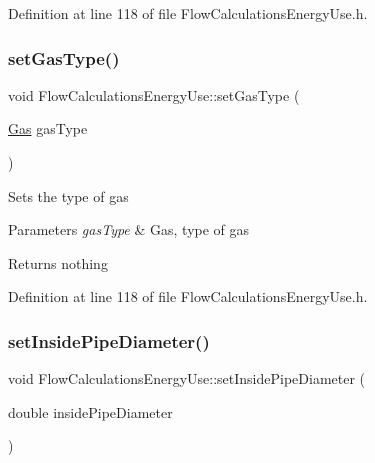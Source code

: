 Definition at line 118 of file Flow\+Calculations\+Energy\+Use.\+h.

\mbox{\label{class_flow_calculations_energy_use_a01b38762426c50e6ab22aefd674f30df}} 
\subsubsection{\texorpdfstring{set\+Gas\+Type()}{setGasType()}\hspace{0.1cm}{\footnotesize\ttfamily [3/3]}}
{\footnotesize\ttfamily void Flow\+Calculations\+Energy\+Use\+::set\+Gas\+Type (\begin{DoxyParamCaption}\item[{\hyperlink{class_flow_calculations_energy_use_a840d5a836e7b05d6791b79bace4440f2}{Gas}}]{gas\+Type }\end{DoxyParamCaption})\hspace{0.3cm}{\ttfamily [inline]}}

Sets the type of gas


\begin{DoxyParams}{Parameters}
{\em gas\+Type} & Gas, type of gas\\
\hline
\end{DoxyParams}
\begin{DoxyReturn}{Returns}
nothing 
\end{DoxyReturn}


Definition at line 118 of file Flow\+Calculations\+Energy\+Use.\+h.

\mbox{\label{class_flow_calculations_energy_use_a616486580460b616a7a8c4935119cd6c}} 
\subsubsection{\texorpdfstring{set\+Inside\+Pipe\+Diameter()}{setInsidePipeDiameter()}\hspace{0.1cm}{\footnotesize\ttfamily [1/3]}}
{\footnotesize\ttfamily void Flow\+Calculations\+Energy\+Use\+::set\+Inside\+Pipe\+Diameter (\begin{DoxyParamCaption}\item[{double}]{inside\+Pipe\+Diameter }\end{DoxyParamCaption})\hspace{0.3cm}{\ttfamily [inline]}}

